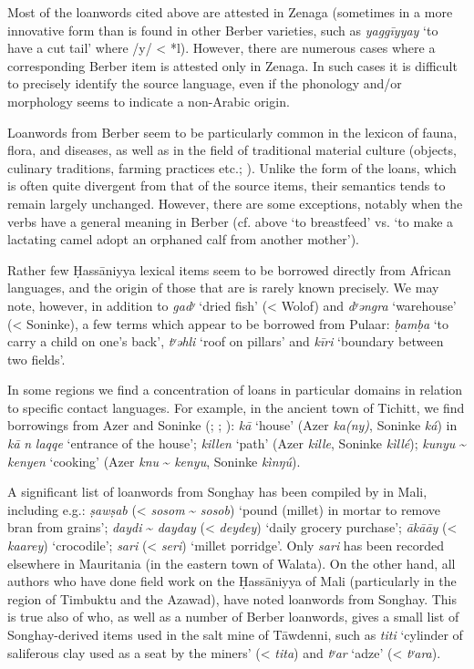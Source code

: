 \documentclass[output=paper]{langsci/langscibook}
\begin{document}
Most of the loanwords cited above are attested in Zenaga (sometimes in a more innovative form than is found in other Berber varieties, such as \textit{yaggīyyay} ‘to have a cut tail’ where /y/ < *l). However, there are numerous cases where a corresponding Berber item is attested only in Zenaga. In such cases it is difficult to precisely identify the source language, even if the phonology and/or morphology seems to indicate a non-Arabic origin. 

Loanwords from Berber seem to be particularly common in the lexicon of fauna, flora, and diseases, as well as in the field of traditional material culture (objects, culinary traditions, farming practices etc.; \citealt{Taine-Cheikh2010lexiques,Taine-Cheikh2014}). Unlike the form of the loans, which is often quite divergent from that of the source items, their semantics tends to remain largely unchanged. However, there are some exceptions, notably when the verbs have a general meaning in Berber (cf. above `to breastfeed' vs. `to make a lactating camel adopt an orphaned calf from another mother'). 


Rather few Ḥassāniyya lexical items seem to be borrowed directly from African languages, and the origin of those that are is rarely known precisely. We may note, however, in addition to \textit{gadʸ} ‘dried fish’ (< Wolof) and \textit{dʸəngra} ‘warehouse’ (< Soninke), a few terms which appear to be borrowed from Pulaar: \textit{ḅamḅa} ‘to carry a child on one’s back’, \textit{tʸəhli} ‘roof on pillars’ and \textit{kīri} ‘boundary between two fields’.

In some regions we find a concentration of loans in particular domains in relation to specific contact languages. For example, in the ancient town of Tichitt, we find borrowings from Azer and Soninke (\citealt{Jacques-Meunié1961}; \citealt{Monteil1939}; \citealt{Diagana2013}): \textit{kā} ‘house’ (Azer \textit{ka(ny)}, Soninke \textit{ká}) in \textit{kā} \textit{n} \textit{laqqe} ‘entrance of the house’; \textit{killen} ‘path’ (Azer \textit{kille}, Soninke \textit{kìllé}); \textit{kunyu} \~{} \textit{kenyen} ‘cooking’ (Azer \textit{knu} \~{} \textit{kenyu}, Soninke \textit{kìnŋú}).

A significant list of loanwords from Songhay has been compiled by \citet{Heath2004} in Mali, including e.g.: \textit{ṣawṣab} (< \textit{sosom} \~{} \textit{sosob}) ‘pound (millet) in mortar to remove bran from grains’; \textit{daydi} \~{} \textit{dayday} (< \textit{deydey}) ‘daily grocery purchase’; \textit{ākā{\R}āy} (< \textit{kaarey}) ‘crocodile’; \textit{sari} (< \textit{seri}) ‘millet porridge’. Only \textit{sari} has been recorded elsewhere in Mauritania (in the eastern town of Walata). On the other hand, all authors who have done field work on the Ḥassāniyya of Mali (particularly in the region of Timbuktu and the Azawad), have noted loanwords from Songhay. This is true also of \citet{Clauzel1960} who, as well as a number of Berber loanwords, gives a small list of Songhay-derived items used in the salt mine of Tāwdenni, such as \textit{titi} ‘cylinder of saliferous clay used as a seat by the miners’ (< \textit{tita}) and \textit{tʸar} ‘adze’ (< \textit{tʸara}).
\end{document}
